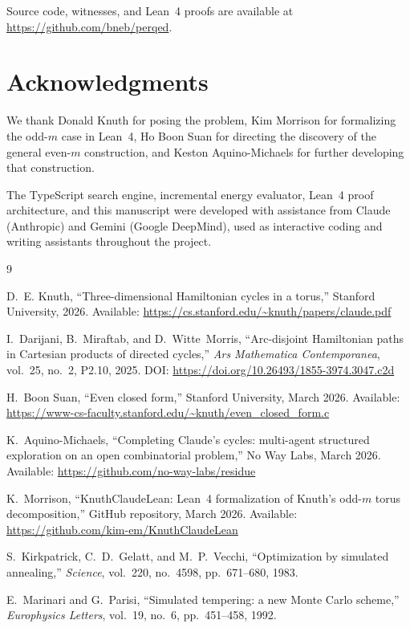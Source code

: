 \documentclass[11pt]{article}
\theoremstyle{plain}
\begin{document}
Source code, witnesses, and Lean~4 proofs are available at
\url{https://github.com/bneb/perqed}.

\section*{Acknowledgments}

We thank Donald Knuth for posing the problem, Kim Morrison for formalizing
the odd-$m$ case in Lean~4, Ho Boon Suan for directing the discovery of the
general even-$m$ construction, and Keston Aquino-Michaels for further
developing that construction.

The TypeScript search engine, incremental energy evaluator, Lean~4 proof
architecture, and this manuscript were developed with assistance from
Claude (Anthropic) and Gemini (Google DeepMind), used as interactive
coding and writing assistants throughout the project.

\begin{thebibliography}{9}

D.~E. Knuth, ``Three-dimensional Hamiltonian cycles in a torus,''
Stanford University, 2026.
Available: \url{https://cs.stanford.edu/~knuth/papers/claude.pdf}

I.~Darijani, B.~Miraftab, and D.~Witte~Morris, ``Arc-disjoint Hamiltonian
paths in Cartesian products of directed cycles,''
\emph{Ars Mathematica Contemporanea}, vol.~25, no.~2, P2.10, 2025.
DOI: \url{https://doi.org/10.26493/1855-3974.3047.c2d}

H.~Boon Suan, ``Even closed form,'' Stanford University, March 2026.
Available: \url{https://www-cs-faculty.stanford.edu/~knuth/even_closed_form.c}

K.~Aquino-Michaels, ``Completing Claude's cycles: multi-agent structured
exploration on an open combinatorial problem,'' No Way Labs, March 2026.
Available: \url{https://github.com/no-way-labs/residue}

K.~Morrison, ``KnuthClaudeLean: Lean~4 formalization of Knuth's odd-$m$
torus decomposition,'' GitHub repository, March 2026.
Available: \url{https://github.com/kim-em/KnuthClaudeLean}

S.~Kirkpatrick, C.~D.~Gelatt, and M.~P.~Vecchi, ``Optimization by simulated
annealing,'' \emph{Science}, vol.~220, no.~4598, pp.~671--680, 1983.

E.~Marinari and G.~Parisi, ``Simulated tempering: a new Monte Carlo scheme,''
\emph{Europhysics Letters}, vol.~19, no.~6, pp.~451--458, 1992.

\end{thebibliography}
\end{document}

